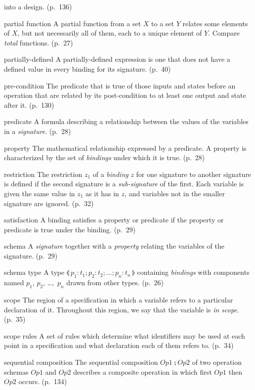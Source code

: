 \begin{theglossary}
  into a design. (p.~136)
\item[partial function] A partial function from a set $X$ to a set $Y$
  relates some elements of $X$, but not necessarily all of them, each to
  a unique element of $Y$. Compare {\em total\/} functions. (p.~27)
\item[partially-defined] A partially-defined expression is one that does
  not have a defined value in every binding for its signature. (p.~40)
\item[pre-condition] The predicate that is true of those inputs and
  states before an operation that are related by its post-condition to
  at least one output and state after it. (p.~130)
\item[predicate] A formula describing a relationship between the values
  of the variables in a {\em signature}. (p.~28)
\item[property] The mathematical relationship expressed by a predicate.
  A property is characterized by the set of {\em bindings\/} under which
  it is true. (p.~28)
\item[restriction] The restriction $z_1$ of a {\em binding\/} $z$ for
  one signature to another signature is defined if the second signature
  is a {\em sub-signature\/} of the first. Each variable is given the
  same value in $z_1$ as it has in $z$, and variables not in the smaller
  signature are ignored. (p.~32)
\item[satisfaction] A binding satisfies a property or predicate if the
  property or predicate is true under the binding. (p.~29)
\item[schema] A {\em signature\/} together with a {\em property\/}
  relating the variables of the signature. (p.~29)
\item[schema type] A type $\lblot~p_1: t_1; p_2: t_2; \ldots; p_n:
  t_n~\rblot$ containing {\em bindings\/} with components named $p_1$,
  $p_2$, \dots,~$p_n$ drawn from other types. (p.~26)
\item[scope] The region of a specification in which a variable refers to
  a particular declaration of it. Throughout this region, we say that
  the variable is {\em in scope}. (p.~35)
\item[scope rules] A set of rules which determine what identifiers may
  be used at each point in a specification and what declaration each of
  them refers to. (p.~34)
\item[sequential composition] The sequential composition $Op1 \semi Op2$
  of two operation schemas $Op1$ and $Op2$ describes a composite
  operation in which first $Op1$ then $Op2$ occurs. (p.~134)

\end{theglossary}
